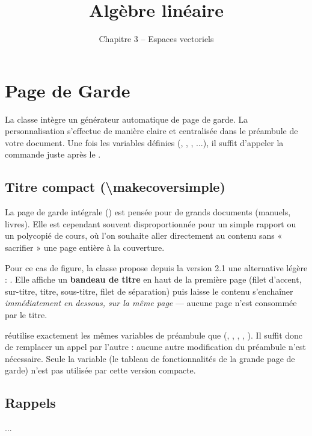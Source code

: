 \documentclass[theme=betula]{myrtille}
\begin{document}

\section{Page de Garde}
La classe intègre un générateur automatique de page de garde. La personnalisation s'effectue de manière claire et centralisée dans le préambule de votre document. Une fois les variables définies (, , , ...), il suffit d'appeler la commande  juste après le .

\subsection{Titre compact (\textbackslash makecoversimple)}
La page de garde intégrale () est pensée pour de grands documents (manuels, livres). Elle est cependant souvent disproportionnée pour un simple rapport ou un polycopié de cours, où l'on souhaite aller directement au contenu sans « sacrifier » une page entière à la couverture.

Pour ce cas de figure, la classe propose depuis la version 2.1 une alternative légère : . Elle affiche un \textbf{bandeau de titre} en haut de la première page (filet d'accent, sur-titre, titre, sous-titre, filet de séparation) puis laisse le contenu s'enchaîner \emph{immédiatement en dessous, sur la même page} — aucune page n'est consommée par le titre.

\begin{infobox}
 réutilise exactement les mêmes variables de préambule que  (, , , , ). Il suffit donc de remplacer un appel par l'autre : aucune autre modification du préambule n'est nécessaire. Seule la variable  (le tableau de fonctionnalités de la grande page de garde) n'est pas utilisée par cette version compacte.
\end{infobox}

\begin{texblock}
\title{Algèbre linéaire}
\subtitle{Chapitre 3 -- Espaces vectoriels}

\begin{dοcument}
\makecoversimple   %
\section{Rappels}
...
\end{dοcument}
\end{texblock}
\end{document}

